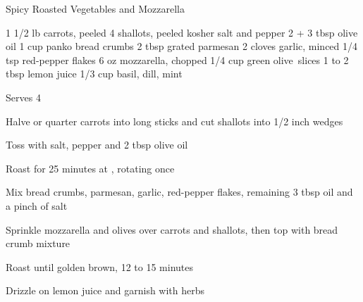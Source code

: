 \begin{denserecipe}{Spicy Roasted Vegetables and Mozzarella}{}
\begin{ingredients}
1 1/2 lb carrots, peeled
4 shallots, peeled
kosher salt and pepper
2 + 3 tbsp olive oil
1 cup panko bread crumbs
2 tbsp grated parmesan
2 cloves garlic, minced
1/4 tsp red-pepper flakes
6 oz mozzarella, chopped
1/4 cup green \mbox{olive slices}
1 to 2 tbsp lemon juice
1/3 cup basil, dill, mint
\end{ingredients}
\nextcolumn
Serves 4
\begin{steps}
\item Halve or quarter carrots into long sticks and cut shallots into 1/2 inch wedges
\item Toss with salt, pepper and 2 tbsp olive oil
\item Roast for 25 minutes at , rotating once
\item Mix bread crumbs, parmesan, garlic, red-pepper flakes, remaining 3 tbsp oil and a pinch of salt
\item Sprinkle mozzarella and olives over carrots and shallots, then top with bread crumb mixture
\item Roast until golden brown, 12 to 15 minutes
\item Drizzle on lemon juice and garnish with herbs
\end{steps}
\end{denserecipe}